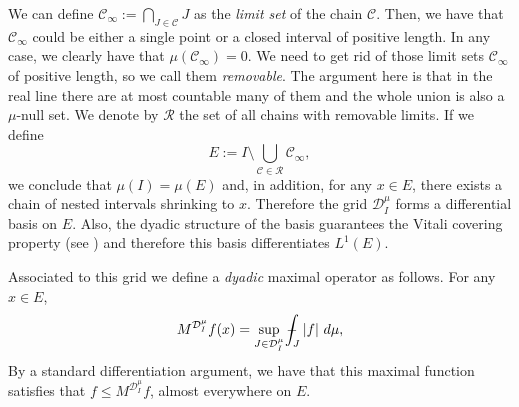 \documentclass[11pt,a4paper]{amsart}
\theoremstyle{definition}
\theoremstyle{remark}
\numberwithin{equation}{section}
\def\Xint#1{\mathchoice
  {\XXint\displaystyle\textstyle{#1}}%
  {\XXint\textstyle\scriptstyle{#1}}%
  {\XXint\scriptstyle\scriptscriptstyle{#1}}%
  {\XXint\scriptscriptstyle\scriptscriptstyle{#1}}%
  \!\int}
\def\XXint#1#2#3{{\setbox0=\hbox{$#1{#2#3}{\int}$}
    \vcenter{\hbox{$#2#3$}}\kern-.5\wd0}}
\def\avgint{\Xint-}
\numberwithin{equation}{section}
\begin{document}
We can define $\mathcal{C}_\infty:=\bigcap_{J\in \mathcal{C}} J$ as the \emph{limit set} of the chain $\mathcal{C}$. Then, we have that $\mathcal{C}_\infty$ 
could be either a single point or a closed interval of positive length. In any case, we clearly have that $\mu(\mathcal{C}_\infty)=0$. 
We need to get rid of those limit sets $\mathcal{C}_\infty$ of positive length, so we call them \emph{removable}. The argument here is that in the real line there are at most countable many of them and the whole union is also a $\mu$-null set. We denote by $\mathcal{R}$ the set of all chains with removable limits.
If we define
\begin{equation*}%
 E:= I\setminus \bigcup_{\mathcal{C}\in \mathcal{R}}\mathcal{C_\infty},
\end{equation*}
we conclude that $\mu(I)=\mu(E)$ and, in addition, for any $x\in E$, there exists a chain of nested intervals shrinking to $x$. Therefore the grid $\mathcal{D}_{I}^\mu$ forms a differential basis on $E$. Also, the dyadic structure of the basis guarantees the Vitali covering property (see \cite[Ch.1]{guz75}) and therefore this basis differentiates $L^1(E)$. 

Associated to this grid we define a \emph{dyadic} maximal operator as follows. For any $x\in E$,
\begin{equation*}
M^{\mathcal{D}_{I}^\mu }f(x) 
=
\sup_{J\in \mathcal D_I^\mu}\avgint_J |f|\ d\mu,
\end{equation*} 
By a standard differentiation argument, we have that this maximal function satisfies that $f\le M^{\mathcal{D}_{I}^\mu } f$,   almost everywhere on $E$. 
\end{document}
